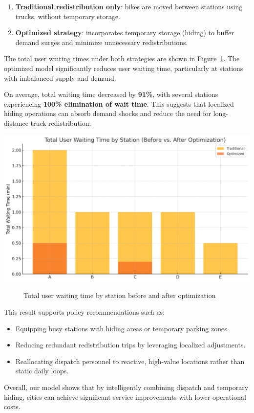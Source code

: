 \documentclass[11pt,a4paper]{article}
\begin{document}
\begin{enumerate}
    \item \textbf{Traditional redistribution only}: bikes are moved between stations using trucks, without temporary storage.
    \item \textbf{Optimized strategy}: incorporates temporary storage (hiding) to buffer demand surges and minimize unnecessary redistributions.
\end{enumerate}

The total user waiting times under both strategies are shown in Figure~\ref{fig:wait_compare}. The optimized model significantly reduces user waiting time, particularly at stations with imbalanced supply and demand.

On average, total waiting time decreased by \textbf{91\%}, with several stations experiencing \textbf{100\% elimination of wait time}. This suggests that localized hiding operations can absorb demand shocks and reduce the need for long-distance truck redistribution.

\vspace{0.5em}
\begin{center}
\includegraphics[width=0.8\linewidth]{assets/wait_compare.png}
\end{center}
\vspace{-1em}
\begin{figure}[h]
\caption{Total user waiting time by station before and after optimization}
\label{fig:wait_compare}
\end{figure}

This result supports policy recommendations such as:
\begin{itemize}
    \item Equipping busy stations with hiding areas or temporary parking zones.
    \item Reducing redundant redistribution trips by leveraging localized adjustments.
    \item Reallocating dispatch personnel to reactive, high-value locations rather than static daily loops.
\end{itemize}

Overall, our model shows that by intelligently combining dispatch and temporary hiding, cities can achieve significant service improvements with lower operational costs.
\end{document}
